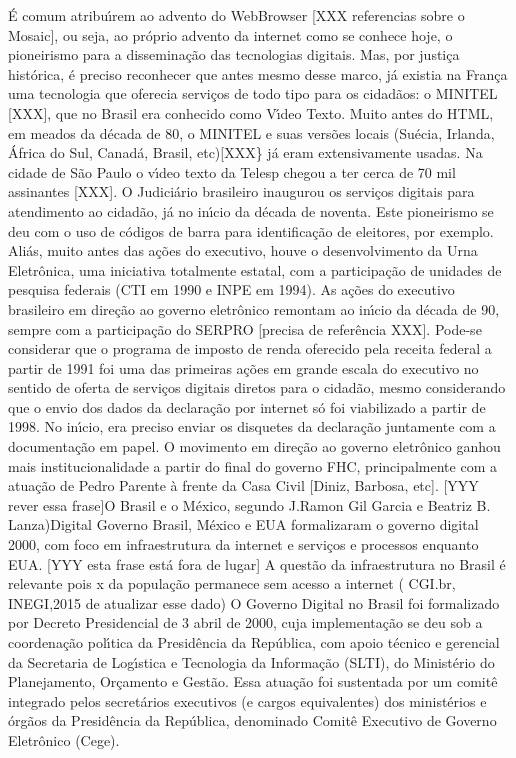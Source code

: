\documentclass[
12pt,		%
openright,	%
twoside,  %
a4paper,			%
chapter=TITLE,		%
english,			%
french,				%
spanish,			%
brazil				%
]{USPSC-classe/USPSC}
\begin{document}
\'E comum atribu\'{\i}rem ao advento do WebBrowser [XXX referencias sobre o Mosaic], ou seja, ao pr\'oprio advento da internet como se conhece hoje, o pioneirismo para a dissemina\c{c}\~ao das tecnologias digitais.
Mas, por justi\c{c}a hist\'orica, \'e preciso reconhecer que antes mesmo desse marco, j\'a existia na Fran\c{c}a uma tecnologia que oferecia servi\c{c}os de todo tipo para os cidad\~aos: o MINITEL [XXX], que no Brasil era conhecido como V\'{\i}deo Texto. Muito antes do HTML, em meados da d\'ecada de 80, o MINITEL e suas vers\~oes locais (Su\'ecia, Irlanda, \'Africa do Sul, Canad\'a, Brasil, etc)[XXX\} j\'a eram extensivamente usadas. Na cidade de S\~ao Paulo o v\'{\i}deo texto da Telesp chegou a ter cerca de 70 mil assinantes [XXX].
O Judici\'ario brasileiro inaugurou os servi\c{c}os digitais para atendimento ao cidad\~ao, j\'a no in\'{\i}cio da d\'ecada de noventa. Este pioneirismo se deu com o uso de c\'odigos de barra para identifica\c{c}\~ao de eleitores, por exemplo. Ali\'as, muito antes das a\c{c}\~oes do executivo, houve o desenvolvimento da Urna Eletr\^onica, uma iniciativa totalmente estatal, com a participa\c{c}\~ao de unidades de pesquisa federais (CTI em 1990 e INPE em 1994). As a\c{c}\~oes do executivo brasileiro em dire\c{c}\~ao ao governo eletr\^onico remontam ao in\'{\i}cio da d\'ecada de 90, sempre com a participa\c{c}\~ao do SERPRO [precisa de refer\^encia XXX]. Pode-se considerar que o programa de imposto de renda oferecido pela receita federal a partir de 1991 foi uma das primeiras a\c{c}\~oes em grande escala do executivo no sentido de oferta de servi\c{c}os digitais diretos para o cidad\~ao, mesmo considerando que o envio dos dados da declara\c{c}\~ao por internet s\'o foi viabilizado a partir de 1998. No in\'{\i}cio, era preciso enviar os disquetes da declara\c{c}\~ao juntamente com a documenta\c{c}\~ao em papel.
O movimento em dire\c{c}\~ao ao governo eletr\^onico ganhou mais institucionalidade a partir do final do governo FHC, principalmente com a atua\c{c}\~ao de Pedro Parente \`a frente da Casa Civil [Diniz, Barbosa, etc].
[YYY rever essa frase]O Brasil e o M\'exico, segundo J.Ramon Gil Garcia e Beatriz B. Lanza)Digital Governo Brasil, M\'exico e EUA formalizaram o governo digital 2000, com foco em infraestrutura da internet e servi\c{c}os e processos enquanto EUA.
[YYY esta frase est\'a fora de lugar] A quest\~ao da infraestrutura no Brasil \'e relevante pois x da popula\c{c}\~ao permanece sem acesso a internet ( CGI.br, INEGI,2015 de atualizar esse dado)
O Governo Digital no Brasil foi formalizado por Decreto Presidencial de 3 abril de 2000, cuja implementa\c{c}\~ao se deu sob a coordena\c{c}\~ao pol\'{\i}tica da Presid\^encia da Rep\'ublica, com apoio t\'ecnico e gerencial da Secretaria de Log\'{\i}stica e Tecnologia da Informa\c{c}\~ao (SLTI), do Minist\'erio do Planejamento, Or\c{c}amento e Gest\~ao. Essa atua\c{c}\~ao foi sustentada por um comit\^e integrado pelos secret\'arios executivos (e cargos equivalentes) dos minist\'erios e \'org\~aos da Presid\^encia da Rep\'ublica, denominado Comit\^e Executivo de Governo Eletr\^onico (Cege).
\end{document}
